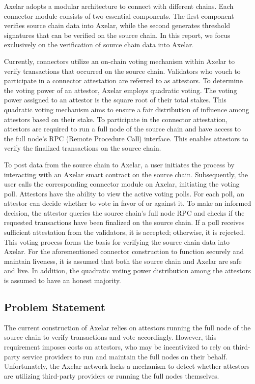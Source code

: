 Axelar adopts a modular architecture to connect with different chains. Each connector module consists of two essential components. The first component verifies source chain data into Axelar, while the second generates threshold signatures that can be verified on the source chain. In this report, we focus exclusively on the verification of source chain data into Axelar.

Currently, connectors utilize an on-chain voting mechanism within Axelar to verify transactions that occurred on the source chain. Validators who vouch to participate in a connector attestation are referred to as attestors. To determine the voting power of an attestor, Axelar employs quadratic voting. The voting power assigned to an attestor is the square root of their total stakes. This quadratic voting mechanism aims to ensure a fair distribution of influence among attestors based on their stake. To participate in the connector attestation, attestors are required to run a full node of the source chain and have access to the full node's RPC (Remote Procedure Call) interface. This enables attestors to verify the finalized transactions on the source chain.

To post data from the source chain to Axelar, a user initiates the process by interacting with an Axelar smart contract on the source chain. Subsequently, the user calls the corresponding connector module on Axelar, initiating the voting poll. Attestors have the ability to view the active voting polls. For each poll, an attestor can decide whether to vote in favor of or against it. To make an informed decision, the attestor queries the source chain's full node RPC and checks if the requested
transactions have been finalized on the source chain. If a poll receives sufficient attestation from the validators, it is accepted; otherwise, it is rejected. This voting process forms the basis for verifying the source chain data into Axelar. 
For the aforementioned connector construction to function securely and maintain liveness, it is assumed that both the source chain and Axelar are safe and live. In addition, the quadratic voting power distribution among the attestors is assumed to have an honest majority.

\subsection{Problem Statement}
The current construction of Axelar relies on attestors running the full node of the source chain to verify transactions and vote accordingly. However, this requirement imposes costs on attestors, who may be incentivized to rely on third-party service providers to run and maintain the full nodes on their behalf. Unfortunately, the Axelar network lacks a mechanism to detect whether attestors are utilizing third-party providers or running the full nodes themselves.

